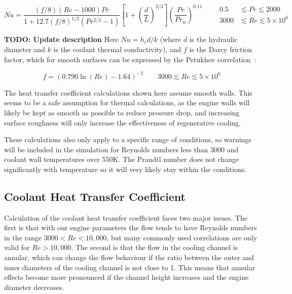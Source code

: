 \documentclass[11pt]{article}
\begin{document}
\begin{equation}
  Nu = \frac{(f/8)(Re - 1000)Pr}{1 + 12.7(f/8)^{1/2}(Pr^{2/3} - 1)} \left[ 1 + \left( \frac{d}{L} \right)^{2/3} \right] \left( \frac{Pr}{Pr_w} \right)^{0.11}
  \qquad
  \begin{aligned}
    0.5 & \lesssim Pr \lesssim 2000 \\
    3000 & \lesssim Re \lesssim 5 \times 10^6
  \end{aligned}
\end{equation}

\textbf{TODO: Update description} Here $Nu = h_c d / k$ (where $d$ is the hydraulic diameter and $k$ is the coolant thermal conductivity), and $f$ is the Darcy friction factor, which for smooth surfaces can be expressed by the Petukhov correlation~\cite{bergman_fundamentals_2017}:

\begin{equation}
  f = (0.790 \ln (Re) - 1.64)^{-2} \qquad 3000 \lesssim Re \lesssim 5 \times 10^6
\end{equation}

The heat transfer coefficient calculations shown here assume smooth walls. This seems to be a safe assumption for thermal calculations, as the engine walls will likely be kept as smooth as possible to reduce pressure drop, and increasing surface roughness will only increase the effectiveness of regenerative cooling.

These calculations also only apply to a specific range of conditions, so warnings will be included in the simulation for Reynolds numbers less than 3000 and coolant wall temperatures over 550K. The Prandtl number does not change significantly with temperature so it will very likely stay within the conditions.

\subsection{Coolant Heat Transfer Coefficient}

Calculation of the coolant heat transfer coefficient faces two major issues. The first is that with our engine parameters the flow tends to have Reynolds numbers in the range $3000 < Re < 10,000$, but many commonly used correlations are only valid for $Re > 10,000$. The second is that the flow in the cooling channel is annular, which can change the flow behaviour if the ratio between the outer and inner diameters of the cooling channel is not close to 1. This means that annular effects become more pronounced if the channel height increases and the engine diameter decreases.
\end{document}
